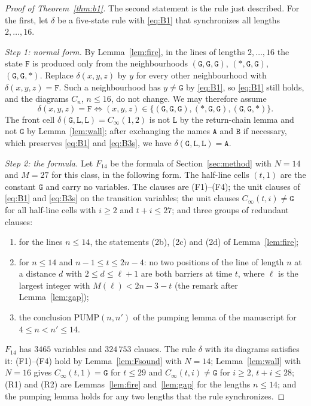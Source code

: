 \documentclass[11pt]{article}
\theoremstyle{remark}
\newcommand{\Lq}{\mathtt{L}}\newcommand{\Gq}{\mathtt{G}}\newcommand{\Aq}{\mathtt{A}}\newcommand{\Bq}{\mathtt{B}}\newcommand{\Fq}{\mathtt{F}}
\begin{document}
\begin{proof}[Proof of Theorem~\ref{thm:b1}]
The second statement is the rule just described. For the first, let $\delta$ be a five-state rule with
\eqref{eq:B1} that synchronizes all lengths $2,\dots,16$.

\emph{Step 1: normal form.} By Lemma~\ref{lem:fire}, in the lines of lengths $2,\dots,16$ the state $\Fq$ is
produced only from the neighbourhoods $(\Gq,\Gq,\Gq)$, $(\ast,\Gq,\Gq)$, $(\Gq,\Gq,\ast)$. Replace
$\delta(x,y,z)$ by $y$ for every other neighbourhood with $\delta(x,y,z)=\Fq$. Such a neighbourhood has
$y\ne\Gq$ by \eqref{eq:B1}, so \eqref{eq:B1} still holds, and the diagrams $C_n$, $n\le16$, do not change. We
may therefore assume
\begin{equation}\label{eq:B3s}
\delta(x,y,z)=\Fq\iff(x,y,z)\in\{(\Gq,\Gq,\Gq),(\ast,\Gq,\Gq),(\Gq,\Gq,\ast)\}. \tag{B3s}
\end{equation}
The front cell $\delta(\Gq,\Lq,\Lq)=C_\infty(1,2)$ is not $\Lq$ by the return-chain lemma and not $\Gq$ by
Lemma~\ref{lem:wall}; after exchanging the names $\Aq$ and $\Bq$ if necessary, which preserves \eqref{eq:B1}
and \eqref{eq:B3s}, we have $\delta(\Gq,\Lq,\Lq)=\Aq$.

\emph{Step 2: the formula.} Let $F_{14}$ be the formula of Section~\ref{sec:method} with $N=14$ and $M=27$ for
this class, in the following form. The half-line cells $(t,1)$ are the constant $\Gq$ and carry no variables.
The clauses are (F1)--(F4); the unit clauses of \eqref{eq:B1} and \eqref{eq:B3s} on the transition variables;
the unit clauses $C_\infty(t,i)\ne\Gq$ for all half-line cells with $i\ge2$ and $t+i\le27$; and three groups
of redundant clauses:
\begin{enumerate}[label=\textup{(R\arabic*)},nosep]
\item for the lines $n\le14$, the statements (2b), (2c) and (2d) of Lemma~\ref{lem:fire};
\item for $n\le14$ and $n-1\le t\le2n-4$: no two positions of the line of length $n$ at a distance $d$ with
$2\le d\le\ell+1$ are both barriers at time $t$, where $\ell$ is the largest integer with
$M(\ell)<2n-3-t$ (the remark after Lemma~\ref{lem:gap});
\item the conclusion $\mathrm{PUMP}(n,n')$ of the pumping lemma of the manuscript for $4\le n<n'\le14$.
\end{enumerate}
$F_{14}$ has $3465$ variables and $324\,753$ clauses. The rule $\delta$ with its diagrams satisfies it:
(F1)--(F4) hold by Lemma~\ref{lem:Fsound} with $N=14$; Lemma~\ref{lem:wall} with $N=16$ gives
$C_\infty(t,1)=\Gq$ for $t\le29$ and $C_\infty(t,i)\ne\Gq$ for $i\ge2$, $t+i\le28$; (R1) and (R2) are
Lemmas~\ref{lem:fire} and~\ref{lem:gap} for the lengths $n\le14$; and the pumping lemma holds for any two
lengths that the rule synchronizes.


\end{proof}
\end{document}
